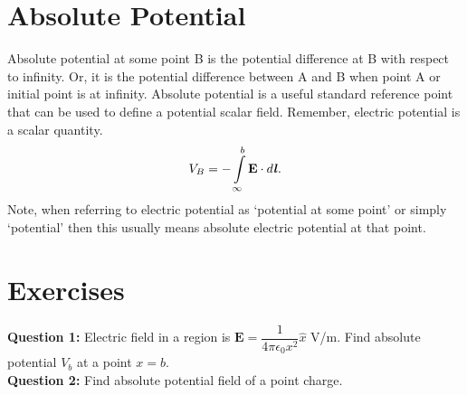 \documentclass[12pt,a4paper]{article}
\begin{document}
\section{Absolute Potential}
Absolute potential at some point B is the potential difference at B with respect to infinity. Or, it is the potential difference between A and B when point A or initial point is at infinity. Absolute potential is a useful standard reference point that can be used to define a potential scalar field. Remember, electric potential is a scalar quantity.
\begin{equation}
V_B=-\int\limits_{\infty}^{b} \textbf{E}\cdot d\textbf{\textit{l}}.
\end{equation}
Note, when referring to electric potential as `potential at some point' or simply `potential' then this usually means absolute electric potential at that point.
\section{Exercises}
\noindent\textbf{Question 1:} Electric field in a region is $\textbf{E}=\dfrac{1}{4\pi\epsilon_0x^2}\hat x$ V/m. Find absolute potential $V_b$ at a point $x=b$.\\[0.2cm]
\noindent\textbf{Question 2:} Find absolute potential field of a point charge.
%
%
\end{document}
